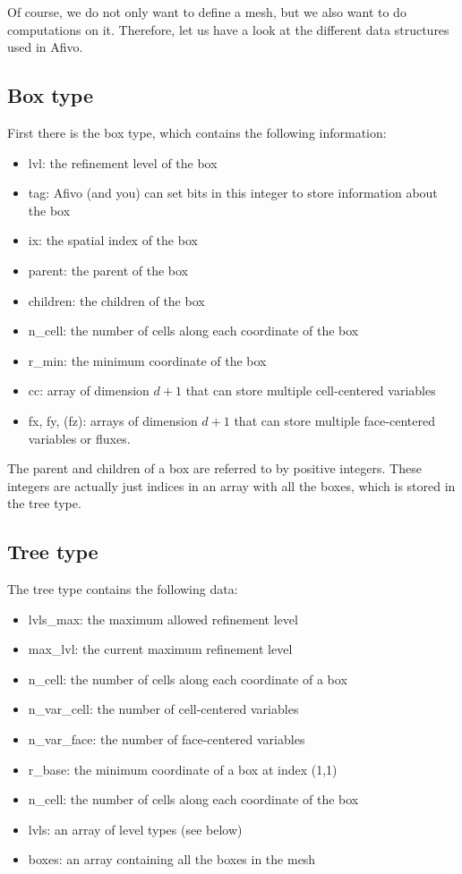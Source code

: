 \documentclass[a4paper, a4wide]{article}
\begin{document}
Of course, we do not only want to define a mesh, but we also want to do
computations on it. Therefore, let us have a look at the different data
structures used in Afivo.

\subsection{Box type}
\label{sec:box-type}

First there is the box type, which contains the following information:
\begin{itemize}
  \item lvl: the refinement level of the box
  \item tag: Afivo (and you) can set bits in this integer to store information
  about the box
  \item ix: the spatial index of the box
  \item parent: the parent of the box
  \item children: the children of the box
  \item n\_cell: the number of cells along each coordinate of the box
  \item r\_min: the minimum coordinate of the box
  \item cc: array of dimension $d+1$ that can store multiple cell-centered
  variables
  \item fx, fy, (fz): arrays of dimension $d+1$ that can store multiple
  face-centered variables or fluxes.
\end{itemize}

The parent and children of a box are referred to by positive integers.
These integers are actually just indices in an array with all the boxes, which
is stored in the tree type.

\subsection{Tree type}
\label{sec:tree-type}

The tree type contains the following data:
\begin{itemize}
  \item lvls\_max: the maximum allowed refinement level
  \item max\_lvl: the current maximum refinement level
  \item n\_cell: the number of cells along each coordinate of a box
  \item n\_var\_cell: the number of cell-centered variables
  \item n\_var\_face: the number of face-centered variables
  \item r\_base: the minimum coordinate of a box at index (1,1)
  \item n\_cell: the number of cells along each coordinate of the box
  \item lvls: an array of level types (see below)
  \item boxes: an array containing all the boxes in the mesh
\end{itemize}
\end{document}
